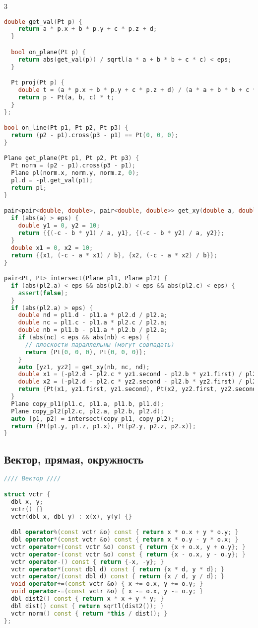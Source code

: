 \documentclass[10pt,a4paper,landscape,twosided]{extarticle}
\begin{document}
\begin{multicols*}{3}
\begin{lstlisting}[language=C++]
  double get_val(Pt p) {
    return a * p.x + b * p.y + c * p.z + d;
  }

  bool on_plane(Pt p) {
    return abs(get_val(p)) / sqrtl(a * a + b * b + c * c) < eps;
  }

  Pt proj(Pt p) {
    double t = (a * p.x + b * p.y + c * p.z + d) / (a * a + b * b + c * c);
    return p - Pt(a, b, c) * t;
  }
};

bool on_line(Pt p1, Pt p2, Pt p3) {
  return (p2 - p1).cross(p3 - p1) == Pt(0, 0, 0);
}

Plane get_plane(Pt p1, Pt p2, Pt p3) {
  Pt norm = (p2 - p1).cross(p3 - p1);
  Plane pl(norm.x, norm.y, norm.z, 0);
  pl.d = -pl.get_val(p1);
  return pl;
}

pair<pair<double, double>, pair<double, double>> get_xy(double a, double b, double c) {
  if (abs(a) > eps) {
    double y1 = 0, y2 = 10;
    return {{(-c - b * y1) / a, y1}, {(-c - b * y2) / a, y2}};
  }
  double x1 = 0, x2 = 10;
  return {{x1, (-c - a * x1) / b}, {x2, (-c - a * x2) / b}};
}

pair<Pt, Pt> intersect(Plane pl1, Plane pl2) {
  if (abs(pl2.a) < eps && abs(pl2.b) < eps && abs(pl2.c) < eps) {
    assert(false);
  }
  if (abs(pl2.a) > eps) {
    double nd = pl1.d - pl1.a * pl2.d / pl2.a;
    double nc = pl1.c - pl1.a * pl2.c / pl2.a;
    double nb = pl1.b - pl1.a * pl2.b / pl2.a;
    if (abs(nc) < eps && abs(nb) < eps) {
      // плоскости параллельны (могут совпадать)
      return {Pt(0, 0, 0), Pt(0, 0, 0)};
    }
    auto [yz1, yz2] = get_xy(nb, nc, nd);
    double x1 = (-pl2.d - pl2.c * yz1.second - pl2.b * yz1.first) / pl2.a;
    double x2 = (-pl2.d - pl2.c * yz2.second - pl2.b * yz2.first) / pl2.a;
    return {Pt(x1, yz1.first, yz1.second), Pt(x2, yz2.first, yz2.second)};
  }
  Plane copy_pl1(pl1.c, pl1.a, pl1.b, pl1.d);
  Plane copy_pl2(pl2.c, pl2.a, pl2.b, pl2.d);
  auto [p1, p2] = intersect(copy_pl1, copy_pl2);
  return {Pt(p1.y, p1.z, p1.x), Pt(p2.y, p2.z, p2.x)};
}
\end{lstlisting}

\subsection{Вектор, прямая, окружность}
\begin{lstlisting}[language=C++]
//// Вектор ////

struct vctr {
  dbl x, y;
  vctr() {}
  vctr(dbl x, dbl y) : x(x), y(y) {}

  dbl operator%(const vctr &o) const { return x * o.x + y * o.y; }
  dbl operator*(const vctr &o) const { return x * o.y - y * o.x; }
  vctr operator+(const vctr &o) const { return {x + o.x, y + o.y}; }
  vctr operator-(const vctr &o) const { return {x - o.x, y - o.y}; }
  vctr operator-() const { return {-x, -y}; }
  vctr operator*(const dbl d) const { return {x * d, y * d}; }
  vctr operator/(const dbl d) const { return {x / d, y / d}; }
  void operator+=(const vctr &o) { x += o.x, y += o.y; }
  void operator-=(const vctr &o) { x -= o.x, y -= o.y; }
  dbl dist2() const { return x * x + y * y; }
  dbl dist() const { return sqrtl(dist2()); }
  vctr norm() const { return *this / dist(); }
};


\end{lstlisting}
\end{multicols*}
\end{document}
